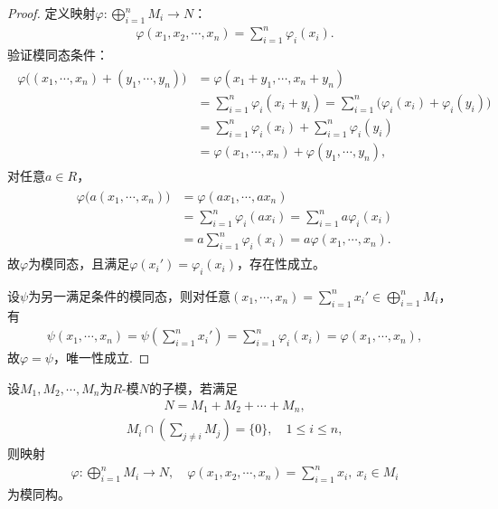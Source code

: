 \documentclass[../../main.tex]{subfiles}%
\begin{document}
\begin{proof}
定义映射$\varphi\colon \bigoplus\limits_{i=1}^n M_i\to N$：
\begin{align*}
\varphi(x_1,x_2,\cdots,x_n)=\sum\limits_{i=1}^n \varphi_i(x_i).
\end{align*}
验证模同态条件：
\begin{align*}
\begin{split}
\varphi\big((x_1,\cdots,x_n)+(y_1,\cdots,y_n)\big)
&=\varphi(x_1+y_1,\cdots,x_n+y_n)\\
&=\sum\limits_{i=1}^n \varphi_i(x_i+y_i)=\sum\limits_{i=1}^n \big(\varphi_i(x_i)+\varphi_i(y_i)\big)\\
&=\sum\limits_{i=1}^n \varphi_i(x_i)+\sum\limits_{i=1}^n \varphi_i(y_i)\\
&=\varphi(x_1,\cdots,x_n)+\varphi(y_1,\cdots,y_n),
\end{split}
\end{align*}
对任意$a\in R$，
\begin{align*}
\begin{split}
\varphi\big(a(x_1,\cdots,x_n)\big)&=\varphi(ax_1,\cdots,ax_n)\\
&=\sum\limits_{i=1}^n \varphi_i(ax_i)=\sum\limits_{i=1}^n a\varphi_i(x_i)\\
&=a\sum\limits_{i=1}^n \varphi_i(x_i)=a\varphi(x_1,\cdots,x_n).
\end{split}
\end{align*}
故$\varphi$为模同态，且满足$\varphi(x_i')=\varphi_i(x_i)$，存在性成立。

设$\psi$为另一满足条件的模同态，则对任意$(x_1,\cdots,x_n)=\sum\limits_{i=1}^n x_i'\in \bigoplus\limits_{i=1}^n M_i$，有
\begin{align*}
\psi(x_1,\cdots,x_n)=\psi\left(\sum\limits_{i=1}^n x_i'\right)=\sum\limits_{i=1}^n \varphi_i(x_i)=\varphi(x_1,\cdots,x_n),
\end{align*}
故$\varphi=\psi$，唯一性成立.
\end{proof}

\begin{theorem}
设$M_1,M_2,\cdots,M_n$为$R$-模$N$的子模，若满足
\begin{align}
N=M_1+M_2+\cdots+M_n,\label{eq:5.2.3}
\end{align}
\begin{align}
M_i\cap\left(\sum\limits_{j\neq i} M_j\right)=\{0\},\quad 1\leqslant i\leqslant n,\label{eq:5.2.4}
\end{align}
则映射
\begin{align*}
\varphi\colon \bigoplus\limits_{i=1}^n M_i\to N,\quad \varphi(x_1,x_2,\cdots,x_n)=\sum\limits_{i=1}^n x_i,\ x_i\in M_i
\end{align*}
为模同构。
\end{theorem}
\end{document}
